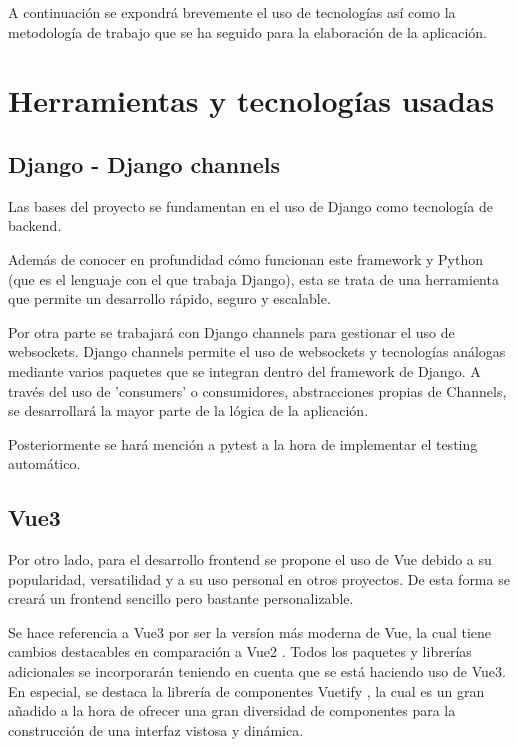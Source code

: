 A continuación se expondrá brevemente el uso de tecnologías así como la metodología
de trabajo que se ha seguido para la elaboración de la aplicación.

\section{Herramientas y tecnologías usadas}

\subsection{Django - Django channels}

Las bases del proyecto se fundamentan en el uso de Django \cite{django} como tecnología de backend.

Además de conocer en profundidad cómo funcionan este framework y Python (que es el lenguaje con el que trabaja Django),
esta se trata de una herramienta que permite un desarrollo rápido, seguro y escalable.

Por otra parte se trabajará con Django channels \cite{djangoChannels} para gestionar el uso de websockets. Django channels
permite el uso de websockets y tecnologías análogas mediante varios paquetes que se integran dentro del framework de Django.
A través del uso de 'consumers' o consumidores, abstracciones propias de Channels, 
se desarrollará la mayor parte de la lógica de la aplicación. 

Posteriormente se hará mención a pytest \cite{pytest} a la hora de implementar el testing automático.

\subsection{Vue3}

Por otro lado, para el desarrollo frontend se propone el uso de Vue \cite{vue3} debido a su popularidad, versatilidad
y a su uso personal en otros proyectos. De esta forma se creará un frontend sencillo pero bastante personalizable.

Se hace referencia a Vue3 por ser la versíon más moderna de Vue, la cual tiene cambios destacables en comparación
a Vue2 \cite{vue3vue2}. Todos los paquetes y librerías adicionales se incorporarán teniendo en cuenta que se está haciendo uso de
Vue3. En especial, se destaca la librería de componentes Vuetify \cite{vuetify}, la cual es un gran añadido a la hora de
ofrecer una gran diversidad de componentes para la construcción de una interfaz vistosa y dinámica.


